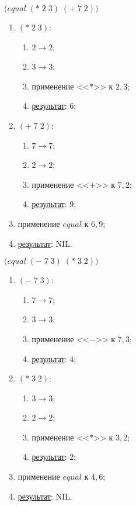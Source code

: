 \newpage
\problem $\bigl(equal\; (*\; 2\; 3)\; (+\; 7\; 2) \bigr)$

\begin{enumerate}
	\item $(*\; 2\; 3)$:
	\begin{enumerate}
		\item $2 \to 2$;
		\item $3 \to 3$;
		\item применение <<$*$>> к $2, 3$;
		\item \underline{результат}: $6$;
	\end{enumerate}
	\item $(+\; 7\; 2)$:
	\begin{enumerate}
		\item $7 \to 7$;
		\item $2 \to 2$;
		\item применение <<$+$>> к $7, 2$;
		\item \underline{результат}: $9$;
	\end{enumerate}
	\item применение $equal$ к $6, 9$;
	\item \underline{результат}: NIL.
\end{enumerate}


\problem $\bigl(equal\; (-\; 7\; 3)\; (*\; 3\; 2) \bigr)$

\begin{enumerate}
	\item $(-\; 7\; 3)$:
	\begin{enumerate}
		\item $7 \to 7$;
		\item $3 \to 3$;
		\item применение <<$-$>> к $7, 3$;
		\item \underline{результат}: $4$;
	\end{enumerate}
	\item $(*\; 3\; 2)$:
	\begin{enumerate}
		\item $3 \to 3$;
		\item $2 \to 2$;
		\item применение <<$*$>> к $3, 2$;
		\item \underline{результат}: $2$;
	\end{enumerate}
	\item применение $equal$ к $4, 6$;
	\item \underline{результат}: NIL.
\end{enumerate}


